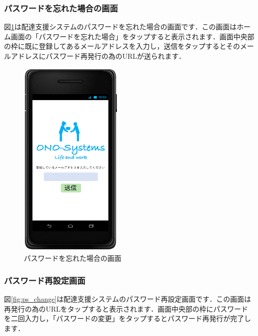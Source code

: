 \documentclass[a4j,titlepage]{jarticle}
\begin{document}
\newpage
\subsubsection{パスワードを忘れた場合の画面}
図\ref{fig:ps_lost}は配達支援システムのパスワードを忘れた場合の画面です．この画面はホーム画面の「パスワードを忘れた場合」をタップすると表示されます．画面中央部の枠に既に登録してあるメールアドレスを入力し，送信をタップするとそのメールアドレスにパスワード再発行の為のURLが送られます．

\begin{figure}[H]
 \begin{center}
  \includegraphics[width=50mm]{ps_lost.png}
	\caption{パスワードを忘れた場合の画面}
	\label{fig:ps_lost}
 \end{center}

\end{figure}
\newpage
\subsubsection{パスワード再設定画面}
図\ref{fig:ps_change}は配達支援システムのパスワード再設定画面です．この画面は再発行の為のURLをタップすると表示されます．画面中央部の枠にパスワードを二回入力し，「パスワードの変更」をタップするとパスワード再発行が完了します．
\end{document}
